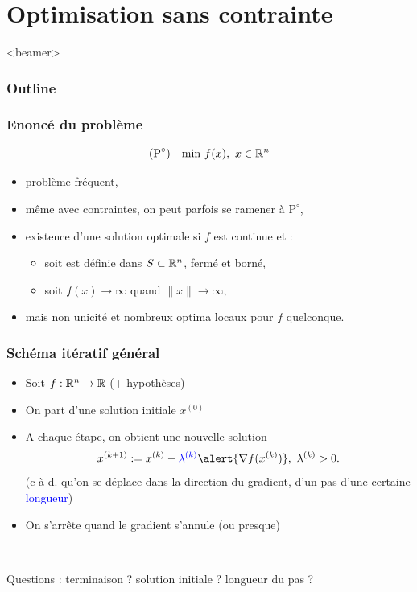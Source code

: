 \documentclass{beamer}
\newcommand{\R}{{\ensuremath\mathbb{R}}}
\begin{document}
\section{Optimisation sans contrainte}

\begin{frame}<beamer>
  \frametitle{Outline}
  \tableofcontents[currentsection]
\end{frame}

\begin{frame}
  \frametitle{Enoncé du problème}

  \[
  (\text{P}^\circ) \quad
    \text{min} \ f(x), \ x \in \R^n
  \]

  \begin{itemize}
  \item problème fréquent,
  \item même avec contraintes, on peut parfois se ramener à $\text{P}^\circ$,
  \item existence d'une solution optimale si $f$ est continue et :
    \begin{itemize}
    \item soit est définie dans $S \subset \R^n$, fermé et borné,
    \item soit $f(x) \rightarrow \infty$ quand $\|x\| \rightarrow \infty$, 
    \end{itemize}
  \item mais non unicité et nombreux optima locaux pour $f$ quelconque.
  \end{itemize}
  
\end{frame}

\begin{frame}
  \frametitle{Schéma itératif général}

  \begin{itemize}
  \item Soit $f : \R^n \rightarrow \R$ (+ hypothèses)
  \item On part d'une solution initiale $x^{(0)}$
  \item A chaque étape, on obtient une nouvelle solution
    \[ x^{(k+1)} := x^{(k)} - \textcolor{blue}{\lambda^{(k)}} \alert{{\nabla f}(x^{(k)})}, \ \lambda^{(k)} > 0. \]
    (c-à-d. qu'on se déplace dans la direction du \alert{gradient},
    d'un pas d'une certaine \textcolor{blue}{longueur})
  \item On s'arrête quand le gradient s'annule (ou presque)
  \end{itemize}

  ~

  Questions : 
  terminaison ?
  solution initiale ?
  longueur du pas ?
\end{frame}
\end{document}
